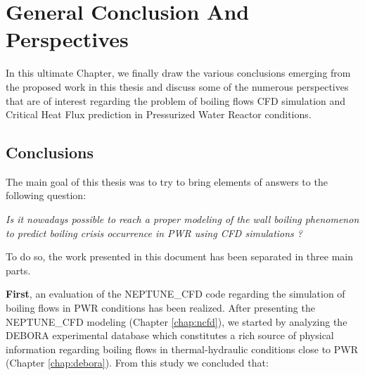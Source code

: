 
\chapter{General Conclusion And Perspectives} %

\label{ch:conclusion} %

In this ultimate Chapter, we finally draw the various conclusions emerging from the proposed work in this thesis and discuss some of the numerous perspectives that are of interest regarding the problem of boiling flows CFD simulation and Critical Heat Flux prediction in Pressurized Water Reactor conditions.


\section{Conclusions}

The main goal of this thesis was to try to bring elements of answers to the following question: 

\begin{center}
\textit{Is it nowadays possible to reach a proper modeling of the wall boiling phenomenon to predict boiling crisis occurrence in PWR using CFD simulations ?}
\end{center}

To do so, the work presented in this document has been separated in three main parts. 

\npar

\textbf{First}, an evaluation of the NEPTUNE\_CFD code regarding the simulation of boiling flows in PWR conditions has been realized. After presenting the NEPTUNE\_CFD modeling (Chapter \ref{chap:ncfd}), we started by analyzing the DEBORA experimental database which constitutes a rich source of physical information regarding boiling flows in thermal-hydraulic conditions close to PWR (Chapter \ref{chap:debora}). From this study we concluded that:

